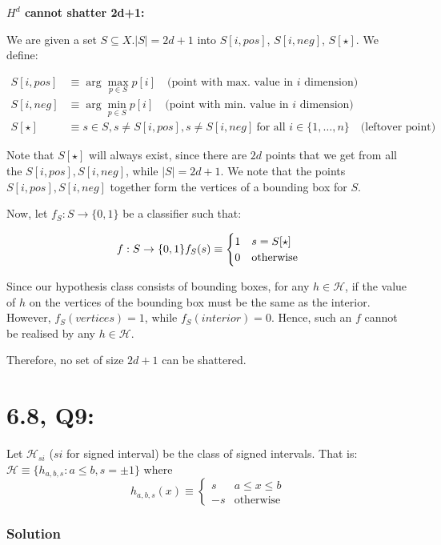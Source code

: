 \documentclass[11pt]{article}
\renewcommand{\H}{\ensuremath{\mathcal{H}}}
\begin{document}
\textbf{$H^d$ cannot shatter 2d+1:}

We are given a set $S \subseteq X$.$|S| = 2d+1$ into $S[i, pos]$,
$S[i, neg]$, $S[\star]$. We define:

\begin{align*}
S[i, pos] &\equiv \arg \max_{p \in S} p[i] \quad \text{(point with max. value in $i$ dimension)}\\
S[i, neg] &\equiv \arg \min_{p \in S} p[i] \quad \text{(point with min. value in $i$ dimension)}\\
S[\star]  &\equiv s \in S, s \neq S[i, pos], s \neq S[i, neg]~\text{for all $i \in \{1, \dots, n\}$} \quad \text{(leftover point)}
\end{align*}

Note that $S[\star]$ will always exist, since there are $2d$ points that we get
from all the $S[i, pos], S[i, neg]$, while $|S| = 2d+1$.  We note that
the points $S[i, pos], S[i, neg]$ together form the vertices of a bounding
box for $S$.

Now, let $f_S: S \rightarrow \{0, 1\}$ be a classifier such that:

$$
f: S \rightarrow \{0, 1\} \\
f_S(s) \equiv
\begin{cases}
1 & s = S[\star] \\
0 & \text{otherwise}
\end{cases}
$$

Since our hypothesis class consists of bounding boxes, for any $h\in \H$, if
the value of $h$ on the vertices of the bounding box must be the same
as the interior. However, $f_S(vertices) = 1$, while $f_S(interior) = 0$.
Hence, such an $f$ cannot be realised by any $h \in \H$. 

Therefore, no set of size $2d+1$ can be shattered.


\section*{6.8, Q9:}
Let $\H_{si}$ ($si$ for signed interval) be the class of signed intervals.
That is: $\H \equiv \{ h_{a, b, s} : a \leq b, s = \pm 1 \}$
where 
$$
h_{a, b, s}(x) \equiv
\begin{cases}
    s & a \leq x \leq b \\
    -s & \text{otherwise}
\end{cases}
$$

\subsubsection*{Solution}
\end{document}
